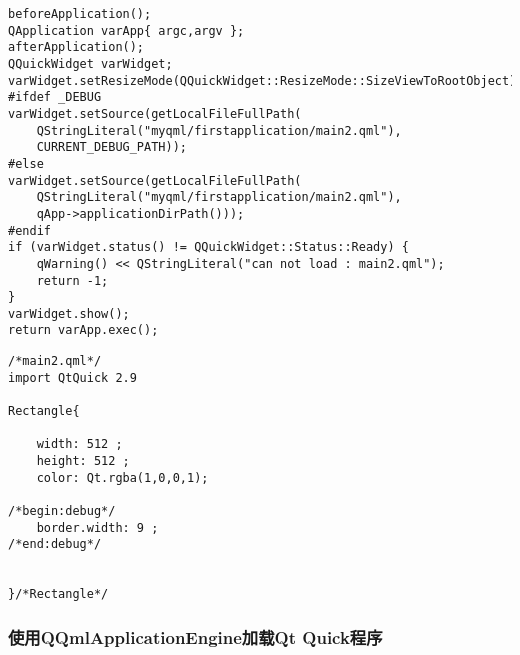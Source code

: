 \begin{lstlisting}[label=f000021,
caption=GoodLuck,
title=\lstlistingname\ \thelstlisting
,firstnumber=90]
beforeApplication();
QApplication varApp{ argc,argv };
afterApplication();
QQuickWidget varWidget;
varWidget.setResizeMode(QQuickWidget::ResizeMode::SizeViewToRootObject);
#ifdef _DEBUG
varWidget.setSource(getLocalFileFullPath(
    QStringLiteral("myqml/firstapplication/main2.qml"),
    CURRENT_DEBUG_PATH));
#else
varWidget.setSource(getLocalFileFullPath(
    QStringLiteral("myqml/firstapplication/main2.qml"),
    qApp->applicationDirPath()));
#endif
if (varWidget.status() != QQuickWidget::Status::Ready) {
    qWarning() << QStringLiteral("can not load : main2.qml");
    return -1;
}
varWidget.show();
return varApp.exec();
\end{lstlisting}          %
\begin{lstlisting}[label=f000024,
caption=GoodLuck,
title=\lstlistingname\ \thelstlisting
]
/*main2.qml*/
import QtQuick 2.9

Rectangle{

    width: 512 ;
    height: 512 ;
    color: Qt.rgba(1,0,0,1);

/*begin:debug*/
    border.width: 9 ;
/*end:debug*/


}/*Rectangle*/
\end{lstlisting}          %

\FloatBarrier
\subsubsection{
使用QQmlApplicationEngine加载Qt Quick程序
}\label{ss001210}


